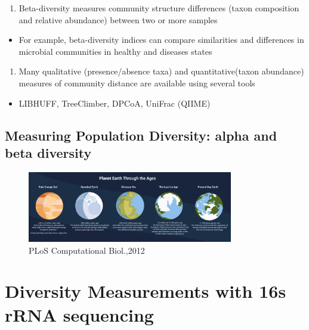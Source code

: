 \documentclass[
]{book}
\providecommand{\tightlist}{%
  \setlength{\itemsep}{0pt}\setlength{\parskip}{0pt}}
\begin{document}
\begin{enumerate}
\def\labelenumi{\arabic{enumi}.}
\tightlist
\item
  Beta-diversity measures community structure differences (taxon composition and relative abundance) between two or more samples
\end{enumerate}

\begin{itemize}
\tightlist
\item
  For example, beta-diversity indices can compare similarities and differences in microbial communities in healthy and diseases states
\end{itemize}

\begin{enumerate}
\def\labelenumi{\arabic{enumi}.}
\setcounter{enumi}{1}
\tightlist
\item
  Many qualitative (presence/absence taxa) and
  quantitative(taxon abundance) measures of community
  distance are available using several tools
\end{enumerate}

\begin{itemize}
\tightlist
\item
  LIBHUFF, TreeClimber, DPCoA, UniFrac (QIIME)
\end{itemize}

\hypertarget{measuring-population-diversity-alpha-and-beta-diversity}{%
\subsection{\texorpdfstring{Measuring Population Diversity: \textbf{alpha and beta diversity}}{Measuring Population Diversity: alpha and beta diversity}}\label{measuring-population-diversity-alpha-and-beta-diversity}}

\begin{figure}
\centering
\includegraphics[width=0.8\textwidth,height=\textheight]{./Figures/Planets.png}
\caption{PLoS Computational Biol.,2012}
\end{figure}

\hypertarget{diversity-measurements-with-16s-rrna-sequencing}{%
\section{Diversity Measurements with 16s rRNA sequencing}\label{diversity-measurements-with-16s-rrna-sequencing}}
\end{document}
